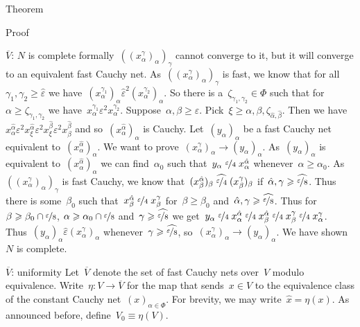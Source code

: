 \begin{parsec}
\begin{point}{Theorem}
\begin{point}{Proof}
\begin{point}{$\overline{V}$: $N$ is complete}
    formally~$((x^\gamma_\alpha)_\alpha)_\gamma$
    cannot converge to it,
    but it will converge to an equivalent fast Cauchy net.
As~$((x^\gamma_\alpha)_\alpha)_\gamma$
    is fast,
    we know that for all~$\gamma_1,\gamma_2 \geq \hat\varepsilon$
we have~$
(x^{\gamma_1}_\alpha)_\alpha \mathrel{\hat\varepsilon^2}
        (x^{\gamma_2}_\alpha)_\alpha$.
So there is a~$\zeta_{\gamma_1,\gamma_2} \in \Phi$
such that for~$\alpha \geq \zeta_{\gamma_1,\gamma_2}$
    we have~$x^{\gamma_1}_\alpha
        \mathrel{\varepsilon^2}
        x^{\gamma_2}_\alpha$.
Suppose~$\alpha,\beta \geq \varepsilon$.
Pick~$\xi \geq \alpha,\beta,\zeta_{\hat\alpha,\hat\beta}$.
Then we have $ x^{\hat{\alpha}}_\alpha
            \mathrel{\varepsilon^2}
        x^{\hat{\alpha}}_\xi
            \mathrel{\varepsilon^2}
        x^{\hat{\beta}}_\xi
            \mathrel{\varepsilon^2}
            x^{\hat{\beta}}_\beta$ and so~$(x_\alpha^{\hat\alpha})_\alpha$
            is Cauchy.
Let~$(y_\alpha)_\alpha$ be a fast Cauchy net equivalent
to~$(x^{\hat\alpha}_\alpha)_\alpha$.
We want to prove~$(x^\gamma_\alpha)_\alpha \to (y_\alpha)_\alpha$.
As~$(y_\alpha)_\alpha$ is equivalent to~$(x^{\hat\alpha}_\alpha)_\alpha$
    we can find~$\alpha_0$
    such that~$y_\alpha \mathrel{\nicefrac{\varepsilon}{4}} x^{\hat\alpha}_\alpha$
    whenever~$\alpha \geq \alpha_0$.
As~$((x^\gamma_\alpha)_\alpha)_\gamma$
is fast Cauchy,
we know that~$(x^{\hat\alpha}_\beta)_\beta
\mathrel{\widehat{\nicefrac{\varepsilon}{4}}}
(x^\gamma_\beta)_\beta $
if~$\hat{\alpha}, \gamma \geq \widehat{\nicefrac{\varepsilon}{8}}$.
Thus there is some~$\beta_0$ such
that~$x^{\hat\alpha}_\beta
\mathrel{\nicefrac{\varepsilon}{4}}
x^\gamma_\beta $
for~$\beta \geq \beta_0$
and~$\hat{\alpha}, \gamma \geq \widehat{\nicefrac{\varepsilon}{8}}$.
Thus for~$\beta \geq \beta_0 \cap \nicefrac{\varepsilon}{8}$,
$\alpha \geq \alpha_0 \cap \nicefrac{\varepsilon}{8}$
and~$\gamma \geq \widehat{\nicefrac{\varepsilon}{8}}$
we get~$y_\alpha
\mathrel{\nicefrac{\varepsilon}{4}}
x^{\hat{\alpha}}_\alpha
\mathrel{\nicefrac{\varepsilon}{4}}
x^{\hat{\alpha}}_\beta
\mathrel{\nicefrac{\varepsilon}{4}}
x^\gamma_\beta
\mathrel{\nicefrac{\varepsilon}{4}}
x^\gamma_\alpha$.
Thus~$(y_\alpha)_\alpha \mathrel{\hat\varepsilon} (x^\gamma_\alpha)_\alpha$
whenever~$\gamma \geq \widehat{\nicefrac{\varepsilon}{8}}$,
so~$(x^\gamma_\alpha)_\alpha \to (y_\alpha)_\alpha$.
We have shown~$N$ is complete.
\end{point}
\begin{point}{$\overline{V}$: uniformity}%
Let~$\overline{V}$ denote the set of fast Cauchy nets over~$V$
    modulo equivalence.
Write~$\eta\colon V \to \overline{V}$
for the map that sends~$x \in V$
to the equivalence class of the constant Cauchy net~$(x)_{\alpha \in \Phi}$.
For brevity, we may write~$\hat{x} = \eta(x)$.
As announced before, define~$V_0 \equiv \eta(V)$.


\end{point}
\end{point}
\end{point}
\end{parsec}
